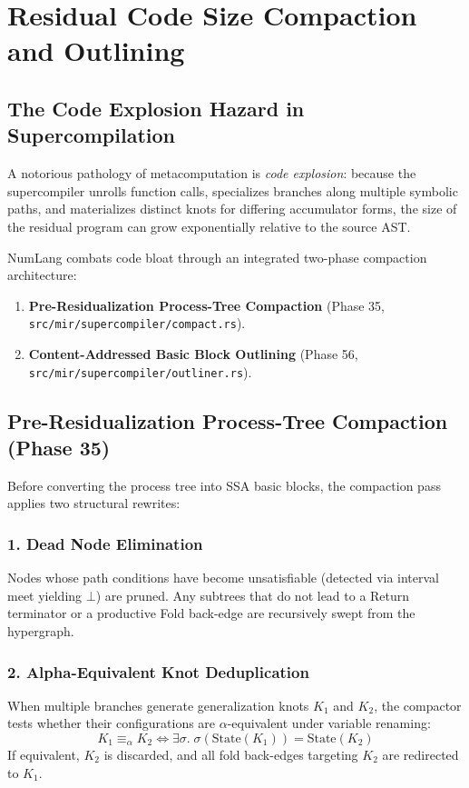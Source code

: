 \chapter{Residual Code Size Compaction and Outlining}
\label{chap:compaction}

\section{The Code Explosion Hazard in Supercompilation}
\label{sec:compaction:hazard}

A notorious pathology of metacomputation is \emph{code explosion}: because the supercompiler unrolls function calls, specializes branches along multiple symbolic paths, and materializes distinct knots for differing accumulator forms, the size of the residual program can grow exponentially relative to the source AST.

NumLang combats code bloat through an integrated two-phase compaction architecture:
\begin{enumerate}
    \item \textbf{Pre-Residualization Process-Tree Compaction} (Phase 35, \texttt{src/mir/supercompiler/compact.rs}).
    \item \textbf{Content-Addressed Basic Block Outlining} (Phase 56, \texttt{src/mir/supercompiler/outliner.rs}).
\end{enumerate}

\section{Pre-Residualization Process-Tree Compaction (Phase 35)}
\label{sec:compaction:tree_compact}

Before converting the process tree into SSA basic blocks, the compaction pass applies two structural rewrites:

\subsection{1. Dead Node Elimination}
Nodes whose path conditions have become unsatisfiable (detected via interval meet yielding $\bot$) are pruned. Any subtrees that do not lead to a Return terminator or a productive Fold back-edge are recursively swept from the hypergraph.

\subsection{2. Alpha-Equivalent Knot Deduplication}
When multiple branches generate generalization knots $K_1$ and $K_2$, the compactor tests whether their configurations are $\alpha$-equivalent under variable renaming:
\begin{equation}
K_1 \equiv_\alpha K_2 \iff \exists \sigma.\; \sigma(\text{State}(K_1)) = \text{State}(K_2)
\end{equation}
If equivalent, $K_2$ is discarded, and all fold back-edges targeting $K_2$ are redirected to $K_1$.

